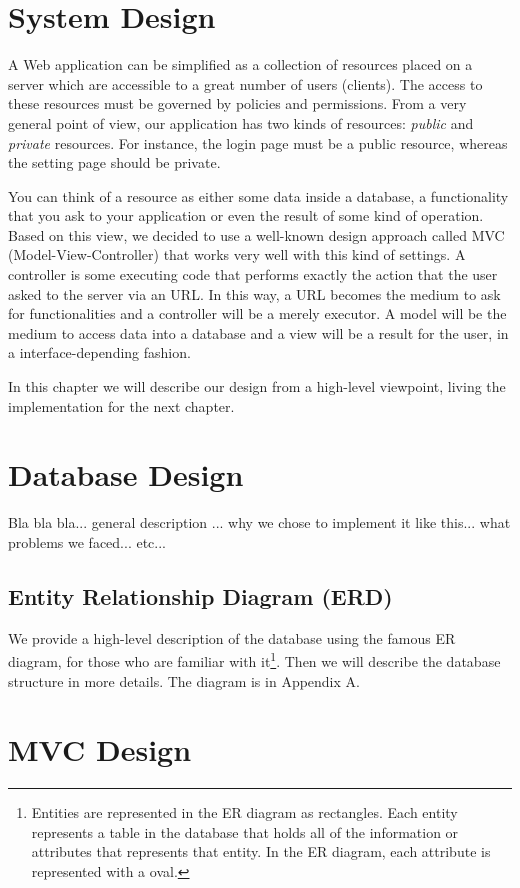 \documentclass[12pt]{report}
\begin{document}
\section{System Design}
A Web application can be simplified as a collection of resources placed on a server which are accessible to a great number of users (clients). The access to these resources must be governed by policies and permissions. From a very general point of view, our application has two kinds of resources: \emph{public} and \emph{private} resources. For instance, the login page must be a public resource, whereas the setting page should be private.

You can think of a resource as either some data inside a database, a functionality that you ask to your application or even the result of some kind of operation. Based on this view, we decided to use a well-known design approach called MVC (Model-View-Controller) that works very well with this kind of settings. A controller is some executing code that performs exactly the action that the user asked to the server via an URL. In this way, a URL becomes the medium to ask for functionalities and a controller will be a merely executor. A model will be the medium to access data into a database and a view will be a result for the user, in a interface-depending fashion.

In this chapter we will describe our design from a high-level viewpoint, living the implementation for the next chapter.

\section{Database Design}
Bla bla bla... general description ... why we chose to implement it like this... what problems we faced... etc...

\subsection{Entity Relationship Diagram (ERD)}
We provide a high-level description of the database using the famous ER diagram, for those who are familiar with it\footnote{Entities are represented in the ER diagram as rectangles.  Each entity represents a table in the database that holds all of the information or attributes that represents that entity.  In the ER diagram, each attribute is represented with a oval.}. Then we will describe the database structure in more details. The diagram is in Appendix A.


\section{MVC Design}
\end{document}
